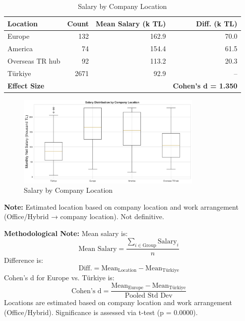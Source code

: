 \documentclass[12pt,a4paper]{article}
\begin{document}
\begin{table}[H]
	\centering
	\small
	\begin{tabular}{lrrr}
		\toprule
		\textbf{Location}    & \textbf{Count} & \textbf{Mean Salary (k TL)} & \textbf{Diff. (k TL)}      \\
		\midrule
		Europe               & 132            & 162.9                       & 70.0                       \\
		America              & 74             & 154.4                       & 61.5                       \\
		Overseas TR hub      & 92             & 113.2                       & 20.3                       \\
		Türkiye             & 2671           & 92.9                        & --                         \\
		\midrule
		\textbf{Effect Size} &                &                             & \textbf{Cohen's d = 1.350} \\
		\bottomrule
	\end{tabular}
	\caption{Salary by Company Location}
\end{table}

\begin{figure}[H]
	\centering
	\includegraphics[width=0.8\textwidth]{figures/boxplot_company_location.png}
	\caption{Salary by Company Location}
\end{figure}
\textbf{Note:} Estimated location based on company location and work arrangement (Office/Hybrid → company location). Not definitive.

\textbf{Methodological Note:}
Mean salary is:
\[
	\text{Mean Salary} = \frac{\sum_{i \in \text{Group}} \text{Salary}_i}{n}
\]
Difference is:
\[
	\text{Diff.} = \text{Mean}_{\text{Location}} - \text{Mean}_{\text{Türkiye}}
\]
Cohen’s d for Europe vs. Türkiye is:
\[
	\text{Cohen’s d} = \frac{\text{Mean}_{\text{Europe}} - \text{Mean}_{\text{Türkiye}}}{\text{Pooled Std Dev}}
\]
Locations are estimated based on company location and work arrangement (Office/Hybrid). Significance is assessed via t-test (p = 0.0000).
\end{document}
